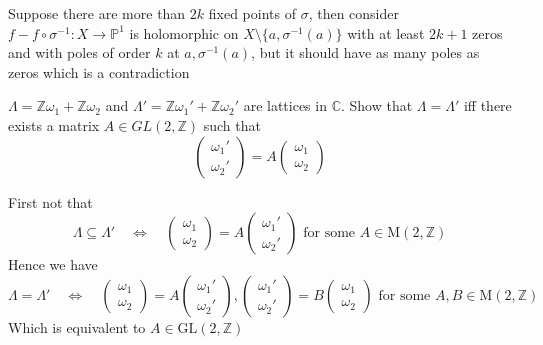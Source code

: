 \documentclass[main]{subfiles}
\begin{document}
\begin{solution}
Suppose there are more than $2k$ fixed points of $\sigma$, then consider $f-f\circ\sigma^{-1}: X\rightarrow\mathbb{P}^1$ is holomorphic on $X\setminus\{a,\sigma^{-1}(a)\}$ with at least $2k+1$ zeros and with poles of order $k$ at $a, \sigma^{-1}(a)$, but it should have as many poles as zeros which is a contradiction
\end{solution}

\begin{exercise}
$\Lambda=\mathbb Z\omega_1+\mathbb Z\omega_2$ and $\Lambda'=\mathbb Z\omega_1'+\mathbb Z\omega_2'$ are lattices in $\mathbb C$. Show that $\Lambda=\Lambda'$ iff there exists a matrix $A\in GL(2,\mathbb Z)$ such that
\[\begin{pmatrix}
\omega_1' \\
\omega_2'
\end{pmatrix}=A\begin{pmatrix}
\omega_1 \\
\omega_2
\end{pmatrix}\]
\end{exercise}

\begin{solution}
First not that
\[
\Lambda \subseteq \Lambda' \quad \Leftrightarrow \quad 
\begin{pmatrix}
\omega_{1}\\ 
\omega_{2}
\end{pmatrix}
=A
\begin{pmatrix}
\omega_{1}'\\ 
\omega_{2}'
\end{pmatrix}
\text{    for some    } A \in \mathrm{M}(2,\mathbb{Z})
\]
Hence we have
\[
\Lambda = \Lambda' \quad \Leftrightarrow \quad 
\begin{pmatrix}
\omega_{1}\\ 
\omega_{2}
\end{pmatrix}
=A
\begin{pmatrix}
\omega_{1}'\\ 
\omega_{2}'
\end{pmatrix}
,
\begin{pmatrix}
\omega_{1}'\\ 
\omega_{2}'
\end{pmatrix}
=B
\begin{pmatrix}
\omega_{1}\\ 
\omega_{2}
\end{pmatrix}
\text{    for some    }A,B \in \mathrm{M}(2,\mathbb{Z})
\]
Which is equivalent to \(A\in \mathrm{GL}(2,\mathbb{Z})\)
\end{solution}
\end{document}
